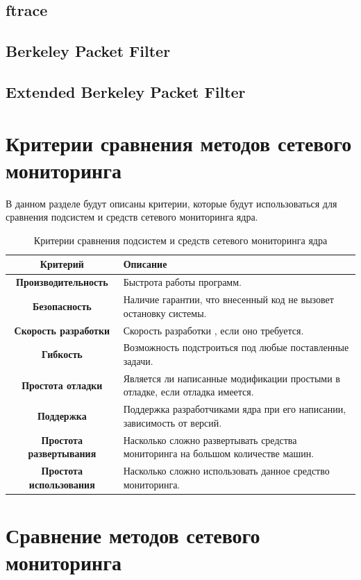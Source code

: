 \subsection{ftrace}

\subsection{Berkeley Packet Filter}

\subsection{Extended Berkeley Packet Filter}

\clearpage

\section{Критерии сравнения методов сетевого мониторинга}

В данном разделе будут описаны критерии, которые будут использоваться для сравнения подсистем и средств сетевого мониторинга ядра.

\begin{table}[h!]
	\begin{center}
		\begin{threeparttable}
			\caption{\label{tb:criteria}Критерии сравнения подсистем и средств сетевого мониторинга ядра}
			\begin{tabular}{|c|p{8cm}|}
				\hline
				\textbf{Критерий} & \textbf{Описание} \\ \hline
				\textbf{Производительность} & Быстрота работы программ. \\ \hline
				\textbf{Безопасность} & Наличие гарантии, что внесенный код не вызовет остановку системы. \\ \hline
				\textbf{Скорость разработки} & Скорость разработки , если оно требуется. \\ \hline
				\textbf{Гибкость} & Возможность подстроиться под любые поставленные задачи. \\ \hline
				\textbf{Простота отладки} & Является ли написанные модификации простыми в отладке, если отладка имеется. \\ \hline
				\textbf{Поддержка} & Поддержка разработчиками ядра при его написании, зависимость от версий. \\ \hline
				\textbf{Простота развертывания} & Насколько сложно развертывать средства мониторинга на большом количестве машин. \\ \hline
				\textbf{Простота использования} & Насколько сложно использовать данное средство мониторинга. \\ \hline
			\end{tabular}
		\end{threeparttable}
	\end{center}
\end{table}

\clearpage

\section{Сравнение методов сетевого мониторинга}
